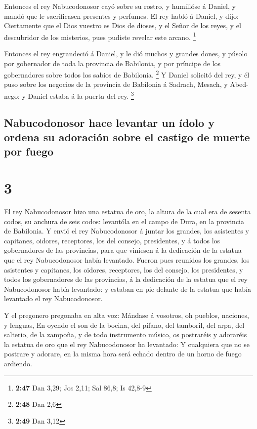  Entonces el rey Nabucodonosor cayó sobre su rostro, y
humillóse á Daniel, y mandó que le sacrificasen presentes y perfumes.
 El rey habló á Daniel, y dijo: Ciertamente que el Dios
vuestro es Dios de dioses, y el Señor de los reyes, y el descubridor de
los misterios, pues pudiste revelar este arcano. \footnote{\textbf{2:47}
  Dan 3,29; Jos 2,11; Sal 86,8; Is 42,8-9}

 Entonces el rey engrandeció á Daniel, y le dió muchos y
grandes dones, y púsolo por gobernador de toda la provincia de
Babilonia, y por príncipe de los gobernadores sobre todos los sabios de
Babilonia. \footnote{\textbf{2:48} Dan 2,6}  Y Daniel
solicitó del rey, y él puso sobre los negocios de la provincia de
Babilonia á Sadrach, Mesach, y Abed-nego: y Daniel estaba á la puerta
del rey. \footnote{\textbf{2:49} Dan 3,12}

\hypertarget{nabucodonosor-hace-levantar-un-uxeddolo-y-ordena-su-adoraciuxf3n-sobre-el-castigo-de-muerte-por-fuego}{%
\subsection{Nabucodonosor hace levantar un ídolo y ordena su adoración
sobre el castigo de muerte por
fuego}\label{nabucodonosor-hace-levantar-un-uxeddolo-y-ordena-su-adoraciuxf3n-sobre-el-castigo-de-muerte-por-fuego}}

\hypertarget{section-2}{%
\section{3}\label{section-2}}

 El rey Nabucodonosor hizo una estatua de oro, la altura de
la cual era de sesenta codos, su anchura de seis codos: levantóla en el
campo de Dura, en la provincia de Babilonia.  Y envió el rey
Nabucodonosor á juntar los grandes, los asistentes y capitanes, oidores,
receptores, los del consejo, presidentes, y á todos los gobernadores de
las provincias, para que viniesen á la dedicación de la estatua que el
rey Nabucodonosor había levantado.  Fueron pues reunidos los
grandes, los asistentes y capitanes, los oidores, receptores, los del
consejo, los presidentes, y todos los gobernadores de las provincias, á
la dedicación de la estatua que el rey Nabucodonosor había levantado: y
estaban en pie delante de la estatua que había levantado el rey
Nabucodonosor.

 Y el pregonero pregonaba en alta voz: Mándase á vosotros,
oh pueblos, naciones, y lenguas,  En oyendo el son de la
bocina, del pífano, del tamboril, del arpa, del salterio, de la zampoña,
y de todo instrumento músico, os postraréis y adoraréis la estatua de
oro que el rey Nabucodonosor ha levantado:  Y cualquiera que
no se postrare y adorare, en la misma hora será echado dentro de un
horno de fuego ardiendo.

